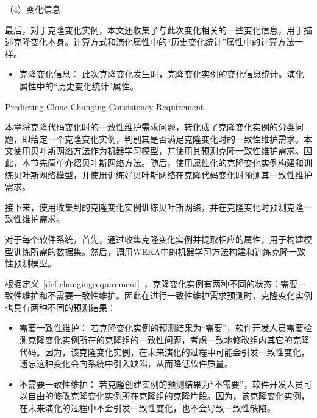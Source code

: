 （4）变化信息

最后，对于克隆变化实例，本文还收集了与此次变化相关的一些变化信息，用于描述克隆变化本身。计算方式和演化属性中的“历史变化统计”属性中的计算方法一样。

\begin {itemize}
\item
克隆变化信息：
此次克隆变化发生时，克隆变化实例的变化信息统计。演化属性中的“历史变化统计”属性。
\end {itemize}



{Predicting Clone Changing Consistency-Requirement} 

本章将克隆代码变化时的一致性维护需求问题，转化成了克隆变化实例的分类问题，即给定一个克隆变化实例，判别其是否满足克隆变化时的一致性维护需求。本文使用贝叶斯网络方法作为机器学习模型，并使用其预测克隆一致性维护需求。因此，本节先简单介绍贝叶斯网络方法。随后，使用属性化的克隆变化实例构建和训练贝叶斯网络模型，并使用训练好贝叶斯网络在克隆代码变化时预测其一致性维护需求。




接下来，使用收集到的克隆变化实例训练贝叶斯网络，并在克隆变化时预测克隆一致性维护需求。

对于每个软件系统，首先，通过收集克隆变化实例并提取相应的属性，用于构建模型训练所需的数据集。然后，调用WEKA中的机器学习方法构建和训练克隆一致性预测模型。

根据定义~\ref{def-changingrequirement}~，克隆变化实例有两种不同的状态：需要一致性维护和不需要一致性维护。因此在进行一致性维护需求预测时，克隆变化实例也具有两种不同的预测结果：
\begin{itemize}
\item 
需要一致性维护：
若克隆变化实例的预测结果为“需要”，软件开发人员需要检测克隆变化实例所在的克隆组的一致性问题，考虑一致地修改组内其它的克隆代码。因为，该克隆变化实例，在未来演化的过程中可能会引发一致性变化，遗忘这种变化会向系统中引入缺陷，从而降低软件质量。
\item
不需要一致性维护：
若克隆创建实例的预测结果为“不需要”，软件开发人员可以自由的修改克隆变化实例所在克隆组的克隆片段。因为，该克隆变化实例，在未来演化的过程中不会引发一致性变化，也不会导致一致性缺陷。
\end{itemize}

